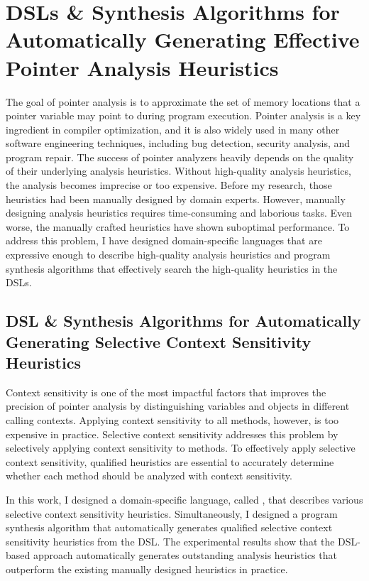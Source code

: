 \documentclass[11pt]{article}
\begin{document}
\section{DSLs \& Synthesis Algorithms for Automatically Generating Effective Pointer Analysis Heuristics}
%
The goal of pointer analysis is to approximate the set of memory locations that a pointer variable may point to during program execution.
%
Pointer analysis is a key ingredient in compiler optimization, and it is also widely used in many other software engineering techniques, including bug detection, security analysis, and program repair.
%
The success of pointer analyzers heavily depends on the quality of their underlying analysis heuristics.
%
Without high-quality analysis heuristics, the analysis becomes imprecise or too expensive.
%
Before my research, those heuristics had been manually designed by domain experts. 
%
However, manually designing analysis heuristics requires time-consuming and laborious tasks.
%
Even worse, the manually crafted heuristics have shown suboptimal performance.
%
To address this problem, I have designed domain-specific languages that are expressive enough to describe high-quality analysis heuristics and program synthesis algorithms that effectively search the high-quality heuristics in the DSLs.



\subsection{DSL \& Synthesis Algorithms for Automatically Generating Selective Context Sensitivity Heuristics~\cite{JeJeChOh17,Jeon2019}}
%
Context sensitivity is one of the most impactful factors that improves the precision of pointer analysis by distinguishing variables and objects in different calling contexts.
%
Applying context sensitivity to all methods, however, is too expensive in practice.
%
Selective context sensitivity addresses this problem by selectively applying context sensitivity to methods.
%
To effectively apply selective context sensitivity, qualified heuristics are essential to accurately determine whether each method should be analyzed with context sensitivity.




In this work, I designed a domain-specific language, called \DisjunctiveModel, that describes various selective context sensitivity heuristics.
%
Simultaneously, I designed a program synthesis algorithm that automatically generates qualified selective context sensitivity heuristics from the DSL.
%
The experimental results show that the DSL-based approach automatically generates outstanding analysis heuristics that outperform the existing manually designed heuristics in practice.
\end{document}
